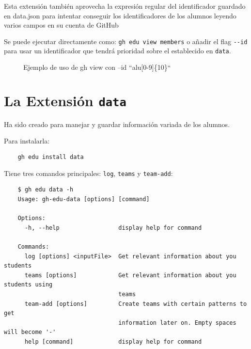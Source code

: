 Esta extensión también aprovecha la expresión regular del identificador guardado en data.json para intentar conseguir los identificadores de los alumnos leyendo varios campos en su cuenta de GitHub

Se puede ejecutar directamente como: \verb|gh edu view members| o añadir el flag \verb|--id| para usar un identificador que tendrá prioridad sobre el establecido en \verb|data|.
\begin{figure}[H]
    \centering
    \caption{Ejemplo de uso de gh view con --id ``alu[0-9]\{10\}``}
    \label{fig:view}
\end{figure}

\section{La Extensión {\tt data}}

Ha sido creado para manejar y guardar información variada de los alumnos.

Para instalarla:
\begin{verbatim}
    gh edu install data
\end{verbatim}

Tiene tres comandos principales: \verb|log|, \verb|teams| y \verb|team-add|:


\begin{verbatim}
    $ gh edu data -h
    Usage: gh-edu-data [options] [command]
    
    Options:
      -h, --help                 display help for command
    
    Commands:
      log [options] <inputFile>  Get relevant information about you students
      teams [options]            Get relevant information about you students using
                                 teams
      team-add [options]         Create teams with certain patterns to get
                                 information later on. Empty spaces will become '-'
      help [command]             display help for command
\end{verbatim}

